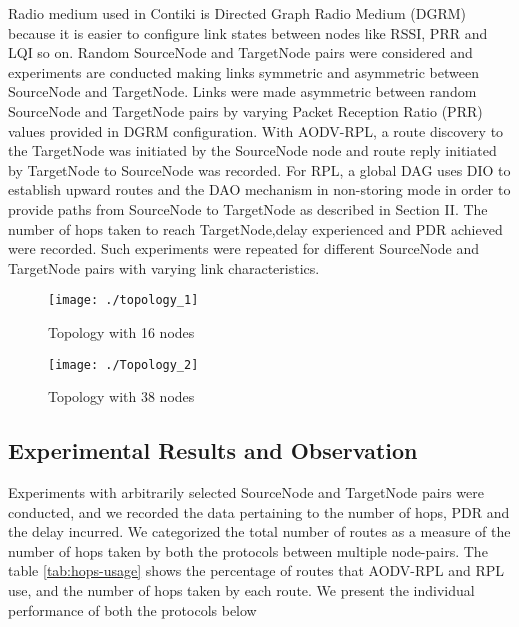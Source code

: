 \documentclass[conference, letterpaper]{IEEEtran}
\begin{document}
Radio medium used in Contiki is Directed Graph Radio Medium (DGRM) because it
is easier to configure link states between nodes like RSSI, PRR and LQI so on.
Random SourceNode and TargetNode pairs were considered and experiments are
conducted  making  links symmetric and asymmetric between SourceNode and
TargetNode. Links were	made asymmetric between random SourceNode and
TargetNode pairs by varying Packet Reception Ratio (PRR) values provided in
DGRM configuration. With AODV-RPL, a route discovery to the TargetNode was
initiated by the  SourceNode node and route reply initiated by TargetNode to
SourceNode was recorded. For RPL, a global DAG uses DIO to establish upward
routes and the DAO mechanism in non-storing mode in order to provide paths from
SourceNode to TargetNode as described in Section II. The number of hops taken
to reach TargetNode,delay experienced and PDR achieved were recorded.  Such
experiments were repeated for different  SourceNode and TargetNode pairs with
varying link characteristics. 

\begin{figure}[h!]
\texttt{[image: ./topology\_1]}
\caption{Topology with 16 nodes}
\label{fig:topology_1}
\end{figure}
\begin{figure}[h!]
\texttt{[image: ./Topology\_2]}
\caption{Topology with 38 nodes}
\label{fig:Topology_2}
\end{figure}

\subsection{Experimental Results and Observation}

Experiments with arbitrarily selected SourceNode and TargetNode pairs were
conducted, and we recorded the data pertaining to the number of hops, PDR and
the delay incurred. We categorized the total number of routes as a measure of
the number of hops taken by both the protocols between multiple node-pairs. The
table \ref{tab:hops-usage} shows the percentage of routes that AODV-RPL and RPL
use, and the number of hops taken by each route. We present the individual
performance of both the protocols below

\end{document}
